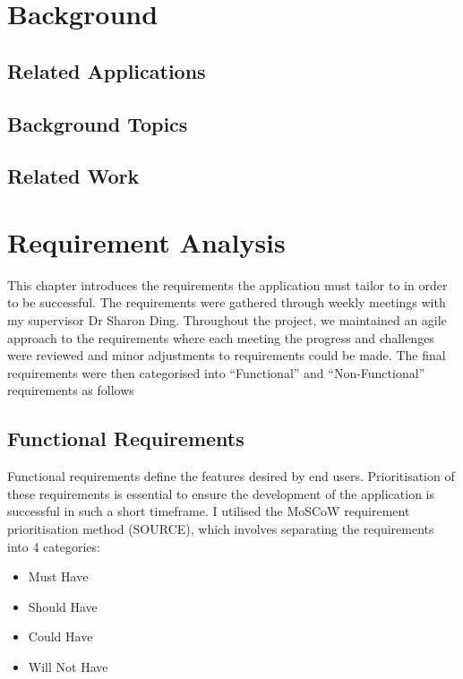 \documentclass{l4proj}
\begin{document}
\chapter{Background}

\section{Related Applications}

\section{Background Topics}

\section{Related Work}

\chapter{Requirement Analysis}

This chapter introduces the requirements the application must tailor to in order to be successful. The requirements were gathered through weekly meetings with my supervisor Dr Sharon Ding. Throughout the project, we maintained an agile approach to the requirements where each meeting the progress and challenges were reviewed and minor adjustments to requirements could be made. The final requirements were then categorised into “Functional” and “Non-Functional” requirements as follows

\section{Functional Requirements}

Functional requirements define the features desired by end users. Prioritisation of these requirements is essential to ensure the development of the application is successful in such a short timeframe. I utilised the MoSCoW requirement prioritisation method (SOURCE), which involves separating the requirements into 4 categories:

\begin{itemize}
    \item Must Have 
    \item Should Have
    \item Could Have
    \item Will Not Have
\end{itemize}
\end{document}
